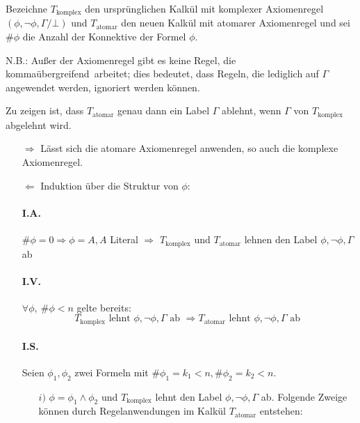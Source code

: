 \newcommand{\Tk}{T_\text{komplex}}
\newcommand{\Ta}{T_\text{atomar}}
Bezeichne $\Tk$ den ursprünglichen Kalkül mit komplexer Axiomenregel $(\phi, \neg \phi, \Gamma / \bot)$ und $\Ta$ den
neuen Kalkül mit atomarer Axiomenregel und sei $\#\phi$ die Anzahl der Konnektive der Formel $\phi$.

N.B.: Außer der Axiomenregel gibt es keine Regel, die \glqq kommaübergreifend\grqq\ arbeitet; dies bedeutet, dass
Regeln, die lediglich auf $\Gamma$ angewendet werden, ignoriert werden können.

Zu zeigen ist, dass $\Ta$ genau dann ein Label $\Gamma$ ablehnt, wenn $\Gamma$ von $\Tk$ abgelehnt wird.

\begin{itemize}
        \item[\glqq$\Rightarrow$\grqq] Lässt sich die atomare Axiomenregel anwenden, so auch die komplexe Axiomenregel.
        \item[\glqq$\Leftarrow$\grqq] Induktion über die Struktur von $\phi$:
                        \paragraph{I.A.} $\#\phi = 0 \Rightarrow \phi = A, A$ Literal $\Rightarrow$ $\Tk$ und $\Ta$ lehnen den
                        Label $\phi, \neg \phi, \Gamma$ ab
                        \paragraph{I.V.} $\forall \phi, \ \#\phi < n$ gelte bereits:
                                \[ \Tk \text{ lehnt } \phi, \neg \phi, \Gamma \text{ ab } \Rightarrow \Ta \text{ lehnt }
                                \phi, \neg \phi, \Gamma \text{ ab } \]
                        \paragraph{I.S.} Seien $\phi_1, \phi_2$ zwei Formeln mit $\#\phi_1 = k_1 < n, \#\phi_2 = k_2 < n$.
                        \begin{itemize}
                                \item[$i)$] $\phi = \phi_1 \wedge \phi_2$ und $\Tk$ lehnt den Label $\phi, \neg \phi, \Gamma$
                                        ab. Folgende Zweige können durch Regelanwendungen im Kalkül $\Ta$ entstehen:


\end{itemize}
\end{itemize}
